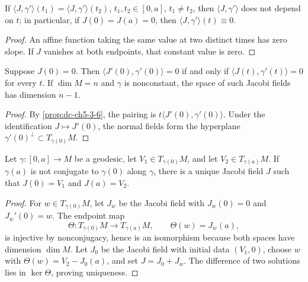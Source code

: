\begin{corollary}
  \label{cor:dc-ch5-3-7}


  If $\langle J,\gamma'\rangle(t_1)=\langle J,\gamma'\rangle(t_2)$, $t_1,t_2\in[0,a]$,
  $t_1\neq t_2$, then $\langle J,\gamma'\rangle$ does not depend on $t$; in
  particular, if $J(0)=J(a)=0$, then $\langle J,\gamma'\rangle(t)\equiv 0$.
\end{corollary}
\begin{proof}

  \sketch
  An affine function taking the same value at two distinct times has zero
  slope. If $J$ vanishes at both endpoints, that constant value is zero.
\end{proof}

\begin{corollary}
  \label{cor:dc-ch5-3-8}


  Suppose $J(0)=0$. Then
  $\langle J'(0),\gamma'(0)\rangle=0$ if and only if
  $\langle J(t),\gamma'(t)\rangle=0$ for every $t$. If $\dim M=n$ and $\gamma$
  is nonconstant, the space of such Jacobi fields has dimension $n-1$.
\end{corollary}
\begin{proof}

  \sketch
  By \cref{prop:dc-ch5-3-6}, the pairing is
  $t\langle J'(0),\gamma'(0)\rangle$. Under the identification
  $J\mapsto J'(0)$, the normal fields form the hyperplane
  $\gamma'(0)^\perp\subset T_{\gamma(0)}M$.
\end{proof}

\begin{proposition}
  \label{prop:dc-ch5-3-9}


  Let $\gamma:[0,a]\to M$ be a geodesic, let
  $V_1\in T_{\gamma(0)}M$, and let $V_2\in T_{\gamma(a)}M$. If $\gamma(a)$ is
  not conjugate to $\gamma(0)$ along $\gamma$, there is a unique Jacobi field
  $J$ such that $J(0)=V_1$ and $J(a)=V_2$.
\end{proposition}
\begin{proof}

  \sketch
  For $w\in T_{\gamma(0)}M$, let $J_w$ be the Jacobi field with
  $J_w(0)=0$ and $J_w'(0)=w$. The endpoint map
  $$
  \Theta:T_{\gamma(0)}M\longrightarrow T_{\gamma(a)}M,\qquad
  \Theta(w)=J_w(a),
  $$
  is injective by nonconjugacy, hence is an isomorphism because both spaces
  have dimension $\dim M$. Let $J_0$ be the Jacobi field with initial data
  $(V_1,0)$, choose $w$ with $\Theta(w)=V_2-J_0(a)$, and set $J=J_0+J_w$.
  The difference of two solutions lies in $\ker\Theta$, proving uniqueness.
\end{proof}

